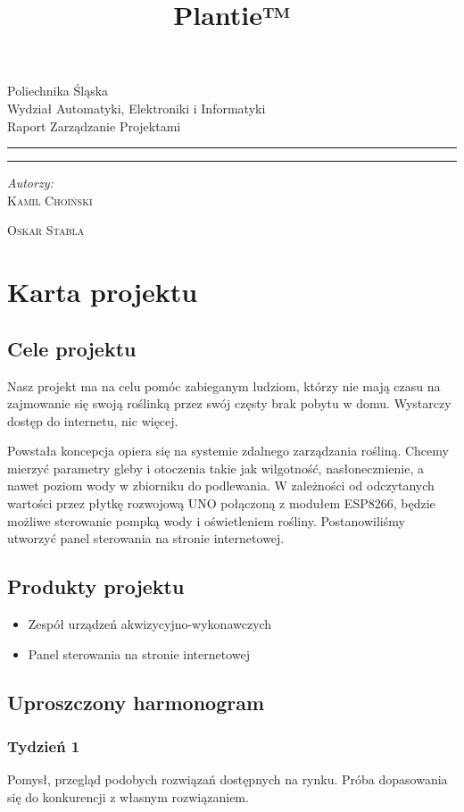 \documentclass[12pt]{article}
\title{Plantie™}
\makeatletter
\newcommand{\linia}{\rule{\linewidth}{0.4mm}}
\renewcommand{\maketitle}{\begin{titlepage}
		\vspace*{1cm}
		\begin{center}\small
			Poliechnika Śląska\\
			Wydział Automatyki, Elektroniki i Informatyki\\
			Raport Zarządzanie Projektami
		\end{center}
		\vspace{3cm}
		\noindent\linia
		\begin{center}
			\LARGE \textsc{\@title}
		\end{center}
		\linia
		\vspace{0.5cm}
		\begin{flushright}
			\begin{minipage}{15cm}
				\textit{\small Autorzy:}\\
				\normalsize \textsc{Kamil Choiński} \par \textsc{Oskar Stabla} \par
			\end{minipage}	
		\end{flushright}
		\vspace*{\stretch{6}}
		\begin{center}
			\@date
		\end{center}
	\end{titlepage}
}
\makeatother
\begin{document}
	
\maketitle

\tableofcontents

\newpage

\section{Karta projektu}


\subsection{Cele projektu}
Nasz projekt ma na celu pomóc zabieganym ludziom, którzy nie mają czasu na zajmowanie się
swoją roślinką przez swój częsty brak pobytu w domu. Wystarczy dostęp do internetu,
nic więcej.

Powstała koncepcja opiera się na systemie zdalnego zarządzania rośliną. Chcemy mierzyć parametry
gleby i otoczenia takie jak wilgotność, nasłonecznienie, a nawet poziom wody w zbiorniku do podlewania. W zależności od odczytanych wartości przez
płytkę rozwojową UNO połączoną z modułem ESP8266, będzie możliwe sterowanie pompką wody i oświetleniem rośliny. Postanowiliśmy utworzyć panel sterowania na stronie
internetowej.

\subsection{Produkty projektu}



\begin{itemize}
	\item Zespół urządzeń akwizycyjno-wykonawczych  
	\item Panel sterowania na stronie internetowej 
\end{itemize}

\subsection{Uproszczony harmonogram}


\subsubsection{Tydzień 1}
Pomysł, przegląd podobych rozwiązań dostępnych na rynku.
Próba dopasowania się do konkurencji z własnym rozwiązaniem.
\end{document}
